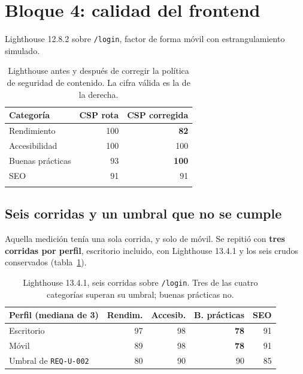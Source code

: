 \documentclass[11pt,a4paper]{article}
\newcommand{\req}[1]{\texttt{#1}}
\begin{document}
\section{Bloque 4: calidad del frontend}\label{sec:frontend}

Lighthouse 12.8.2 sobre \texttt{/login}, factor de forma móvil con
estrangulamiento simulado.

\begin{longtable}{@{}p{6cm}rr@{}}
\toprule
\textbf{Categoría} & \textbf{CSP rota} & \textbf{CSP corregida} \\
\midrule
\endhead
Rendimiento & 100 & \textbf{82} \\
Accesibilidad & 100 & 100 \\
Buenas prácticas & 93 & \textbf{100} \\
SEO & 91 & 91 \\
\bottomrule
\caption{Lighthouse antes y después de corregir la política de seguridad de
contenido. La cifra válida es la de la derecha.}
\end{longtable}

\subsection{Seis corridas y un umbral que no se cumple}

Aquella medición tenía una sola corrida, y solo de móvil. Se repitió con
\textbf{tres corridas por perfil}, escritorio incluido, con Lighthouse 13.4.1 y
los seis crudos conservados (tabla~\ref{tab:lighthouse6}).

\begin{table}[htbp]
\centering
\small
\begin{tabular}{@{}lrrrr@{}}
\toprule
\textbf{Perfil (mediana de 3)} & \textbf{Rendim.} & \textbf{Accesib.} & \textbf{B. prácticas} & \textbf{SEO} \\
\midrule
Escritorio & 97 & 98 & \textbf{78} & 91 \\
Móvil & 89 & 98 & \textbf{78} & 91 \\
\midrule
Umbral de \req{REQ-U-002} & 80 & 90 & 90 & 85 \\
\bottomrule
\end{tabular}
\caption{Lighthouse 13.4.1, seis corridas sobre \texttt{/login}. Tres de las
cuatro categorías superan su umbral; buenas prácticas no.}
\label{tab:lighthouse6}
\end{table}
\end{document}
